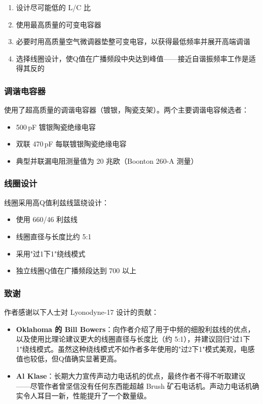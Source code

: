 \begin{enumerate}
    \item 设计尽可能低的 L/C 比
    \item 使用最高质量的可变电容器
    \item 必要时用高质量空气微调器垫整可变电容，以获得最低频率并展开高端调谐
    \item 选择线圈设计，使Q值在广播频段中央达到峰值——接近自谐振频率工作是适得其反的
\end{enumerate}

\subsubsection*{调谐电容器}

使用了超高质量的调谐电容器（镀银，陶瓷支架）。两个主要调谐电容候选者：
\begin{itemize}[leftmargin=2cm]
    \item 500\,pF 镀银陶瓷绝缘电容
    \item 双联 470\,pF 每联镀银陶瓷绝缘电容
    \item 典型并联漏电阻测量值为 20 兆欧（Boonton 260-A 测量）
\end{itemize}

\subsubsection*{线圈设计}

线圈采用高Q值利兹线篮绕设计：
\begin{itemize}[leftmargin=2cm]
    \item 使用 660/46 利兹线
    \item 线圈直径与长度比约 5:1
    \item 采用"过1下1"绕线模式
    \item 独立线圈Q值在广播频段达到 700 以上
\end{itemize}

\subsubsection*{致谢}

作者感谢以下人士对 Lyonodyne-17 设计的贡献：

\begin{itemize}[leftmargin=2cm]
    \item \textbf{Oklahoma 的 Bill Bowers}：向作者介绍了用于中频的细股利兹线的优点，以及使用比理论建议更大的线圈直径与长度比（约 5:1），并建议回归"过1下1"绕线模式。虽然这种绕线模式不如作者多年使用的"过2下1"模式美观，电感值也较低，但Q值确实显著更高。
    \item \textbf{Al Klase}：长期大力宣传声动力电话机的优点，最终作者不得不听取建议——尽管作者曾坚信没有任何东西能超越 Brush 矿石电话机。声动力电话机确实令人耳目一新，性能提升了一个数量级。
\end{itemize}

